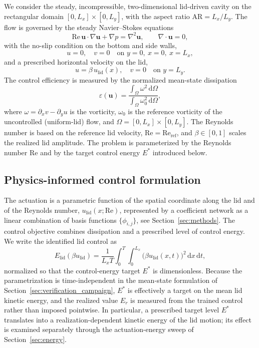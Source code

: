 \documentclass[aip,pof,reprint,superscriptaddress]{revtex4-2}
\newcommand{\re}{\mathrm{Re}}
\begin{document}
We consider the steady, incompressible, two-dimensional lid-driven cavity on the rectangular domain $[0,L_x]\times[0,L_y]$, with the aspect ratio $\mathrm{AR}=L_x/L_y$. The flow is governed by the steady Navier--Stokes equations
\begin{equation}\label{eq:ns}
\re\,\bm u\cdot\nabla\bm u+\nabla p=\nabla^2\bm u,
\qquad\nabla\cdot\bm u=0,
\end{equation}
with the no-slip condition on the bottom and side walls,
\begin{equation}\label{eq:noslip}
u=0,\quad v=0\quad\text{on } y=0,\ x=0,\ x=L_x,
\end{equation}
and a prescribed horizontal velocity on the lid,
\begin{equation}\label{eq:lidbc}
u=\beta\,u_{\mathrm{lid}}(x),\quad v=0\quad\text{on } y=L_y.
\end{equation}
The control efficiency is measured by the normalized mean-state dissipation
\begin{equation}\label{eq:diss}
\varepsilon(\bm u)=\frac{\displaystyle\int_\Omega \omega^2\,\mathrm{d}\Omega}{\displaystyle\int_\Omega \omega_0^2\,\mathrm{d}\Omega},
\end{equation}
where $\omega=\partial_x v-\partial_y u$ is the vorticity, $\omega_0$ is the reference vorticity of the uncontrolled (uniform-lid) flow, and $\Omega=[0,L_x]\times[0,L_y]$. The Reynolds number is based on the reference lid velocity, $\re=\re_{\mathrm{ref}}$, and $\beta\in[0,1]$ scales the realized lid amplitude. The problem is parameterized by the Reynolds number $\re$ and by the target control energy $E^*$ introduced below.

\subsection{Physics-informed control formulation}

The actuation is a parametric function of the spatial coordinate along the lid and of the Reynolds number,
$u_{\mathrm{lid}}(x;\re)$, represented by a coefficient network as a linear combination of basis functions $\{\phi_{i,j}\}$,
see Section~\ref{sec:methods}. The control objective combines dissipation and a prescribed level of control energy. We write the identified lid control as
\begin{equation}\label{eq:energy}
E_{\mathrm{lid}}(\beta u_{\mathrm{lid}})=\frac{1}{L_xT}\int_0^T\int_0^{L_x} \bigl(\beta u_{\mathrm{lid}}(x,t)\bigr)^2\,\mathrm{d}x\,\mathrm{d}t,
\end{equation}
normalized so that the control-energy target $E^*$ is dimensionless. Because the parametrization is time-independent in the mean-state formulation of Section~\ref{sec:verification_campaign}, $E^*$ is effectively a target on the mean lid kinetic energy, and the realized value $E_r$ is measured from the trained control rather than imposed pointwise. In particular, a prescribed target level $E^*$ translates into a realization-dependent kinetic energy of the lid motion; its effect is examined separately through the actuation-energy sweep of Section~\ref{sec:energy}.
\end{document}
